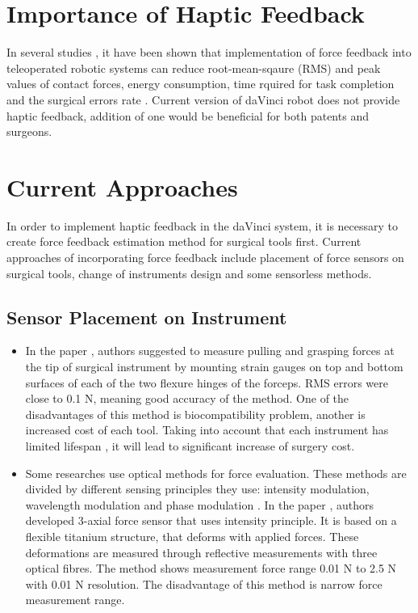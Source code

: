 

\section{Importance of Haptic Feedback}
\label{sec:hapticFeedbackImportance}

In several studies \cite{lim_role_2015, alleblas_effects_2017, currie_role_2017}, it have been shown that implementation of force feedback into teleoperated robotic systems can reduce root-mean-sqaure (RMS) and peak values of contact forces, energy consumption, time rquired for task completion and the surgical errors rate \cite{tavakoli_haptics_2008}. Current version of daVinci robot does not provide haptic feedback, addition of one would be beneficial for both patents and surgeons.

\section{Current Approaches}
\label{sec:CurAppr}

In order to implement haptic feedback in the daVinci system, it is necessary to create force feedback estimation method for surgical tools first. Current approaches of incorporating force feedback include placement of force sensors on surgical tools, change of instruments design and some sensorless methods.

\subsection{Sensor Placement on Instrument}
\begin{itemize}
\item In the paper \cite{hong_design_2012}, authors suggested to measure pulling and grasping forces at the tip of surgical instrument by mounting strain gauges on top and bottom surfaces of each of the two flexure hinges of the forceps. RMS errors were close to 0.1 N, meaning good accuracy of the method. One of the disadvantages of this method is biocompatibility problem, another is increased cost of each tool. Taking into account that each instrument has limited lifespan  \cite{ho_health_2011}, it will lead to significant increase of surgery cost.

\item  Some researches use optical methods for force evaluation. These methods are divided by different sensing principles they use: intensity modulation, wavelength modulation and phase modulation \cite{su_fiber_optic_2017}. In the paper \cite{_micro_2004}, authors developed 3-axial force sensor that uses intensity principle. It is based on a flexible titanium structure, that deforms with applied forces. These deformations are measured through reflective measurements with three optical fibres. The method shows measurement force range 0.01 N to 2.5 N with 0.01 N resolution. The disadvantage of this method is narrow force measurement range.
\end{itemize}


